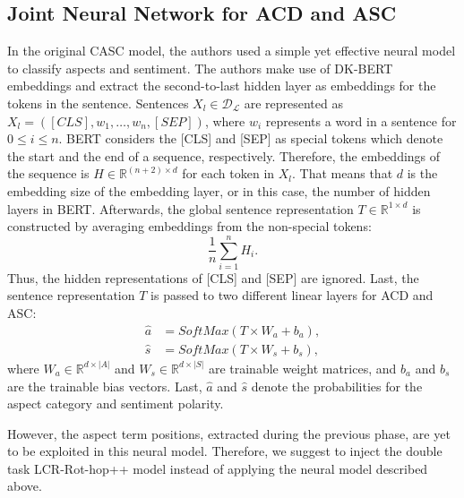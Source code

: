 \documentclass[american, oneside]{ecsgdp}
\begin{document}
\subsection{Joint Neural Network for ACD and ASC} %
In the original CASC model, the authors used a simple yet effective neural model to classify aspects and sentiment. The authors make use of DK-BERT embeddings and extract the second-to-last hidden layer as embeddings for the tokens in the sentence. Sentences $X_l \in \mathcal{D_\mathcal{L}}$ are represented as $X_l = \left ( [CLS], w_1, \ldots, w_n, [SEP] \right )$, where $w_i$ represents a word in a sentence for $0 \leq i \leq n$. BERT considers the [CLS] and [SEP] as special tokens which denote the start and the end of a sequence, respectively. Therefore, the embeddings of the sequence is $H \in \mathbb{R}^{(n+2) \times d}$ for each token in $X_l$. That means that $d$ is the embedding size of the embedding layer, or in this case, the number of hidden layers in BERT. Afterwards, the global sentence representation $T \in \mathbb{R}^{1 \times d}$ is constructed by averaging embeddings from the non-special tokens: 
\begin{equation} 
    \frac{1}{n} \sum_{i=1}^{n}H_i. 
\end{equation}
Thus, the hidden representations of [CLS] and [SEP] are ignored. Last, the sentence representation $T$ is passed to two different linear layers for ACD and ASC: 
\begin{align}
    \hat{a} & = SoftMax(T \times W_a + b_a), \\
    \hat{s} & = SoftMax(T \times W_s + b_s),
\end{align}
where $W_a \in \mathbb{R}^{d \times \lvert A \rvert}$ and $W_s \in \mathbb{R}^{d \times \lvert S \rvert}$ are trainable weight matrices, and $b_a$ and $b_s$ are the trainable bias vectors. Last, $\hat{a}$ and  $\hat{s}$ denote the probabilities for the aspect category and sentiment polarity. 

\begin{figure}[htbp]
  \centering
  
  \caption{}
  \label{fig:simple_neural}
\end{figure}

However, the aspect term positions, extracted during the previous phase, are yet to be exploited in this neural model. Therefore, we suggest to inject the double task LCR-Rot-hop++ model instead of applying the neural model described above. 
\end{document}
